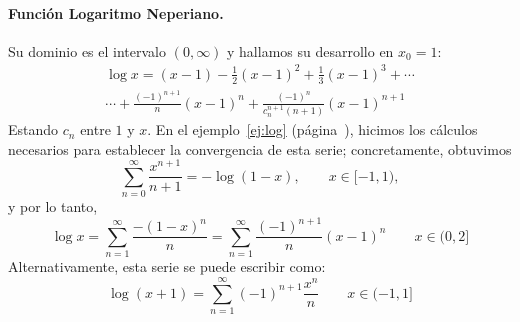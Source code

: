 \paragraph{Función Logaritmo Neperiano.}
Su dominio es el intervalo $(0,\infty)$ y hallamos su desarrollo en $x_0=1$:
\begin{multline*}
\log x =(x-1)-\frac{1}{2}(x-1)^2+\frac{1}{3}(x-1)^3+\cdots\\
\cdots +\frac{(-1)^{n+1}}{n}(x-1)^n+ \frac{(-1)^{n}}{c_n^{n+1}(n+1)}(x-1)^{n+1}
\end{multline*}
Estando $c_n$ entre $1$ y $x$.
En el ejemplo~\ref{ej:log} (página~\pageref{ej:log}), hicimos los cálculos necesarios para establecer la convergencia de esta serie;
concretamente, obtuvimos
\[
\displaystyle\sum_{n=0}^\infty   \frac{x^{n+1}}{n+1} = -\log (1-x),\qquad x\in [-1,1),
\]
y por lo tanto,
\[
\log x=\displaystyle\sum_{n=1}^\infty   \frac{-(1-x)^n}{n}=\displaystyle\sum_{n=1}^\infty   \frac{(-1)^{n+1}}{n}(x-1)^n\qquad x\in (0,2]
\]
Alternativamente, esta serie se puede escribir como:
\[
\log (x+1) =\displaystyle\sum_{n=1}^\infty   (-1)^{n+1}\frac{x^n}{n}\qquad x\in (-1,1]
\]
%
